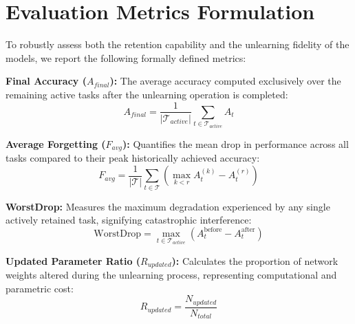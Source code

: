 \documentclass[conference]{IEEEtran}
\theoremstyle{plain}
\theoremstyle{definition}
\theoremstyle{remark}
\begin{document}
\section{Evaluation Metrics Formulation}
To robustly assess both the retention capability and the unlearning fidelity of the models, we report the following formally defined metrics:

\textbf{Final Accuracy ($A_{final}$):} The average accuracy computed exclusively over the remaining active tasks after the unlearning operation is completed:
\begin{equation}
A_{final} = \frac{1}{|\mathcal{T}_{active}|} \sum_{t \in \mathcal{T}_{active}} A_{t}
\end{equation}

\textbf{Average Forgetting ($F_{avg}$):} Quantifies the mean drop in performance across all tasks compared to their peak historically achieved accuracy:
\begin{equation}
F_{avg} = \frac{1}{|\mathcal{T}|} \sum_{t \in \mathcal{T}} \left( \max_{k < r} A_{t}^{(k)} - A_{t}^{(r)} \right)
\end{equation}

\textbf{WorstDrop:} Measures the maximum degradation experienced by any single actively retained task, signifying catastrophic interference:
\begin{equation}
\label{eq:worstdrop}
\text{WorstDrop} = \max_{t \in \mathcal{T}_{active}} \left( A_{t}^{\text{before}} - A_{t}^{\text{after}} \right)
\end{equation}

\textbf{Updated Parameter Ratio ($R_{updated}$):} Calculates the proportion of network weights altered during the unlearning process, representing computational and parametric cost:
\begin{equation}
R_{updated} = \frac{N_{updated}}{N_{total}}
\end{equation}
\end{document}
